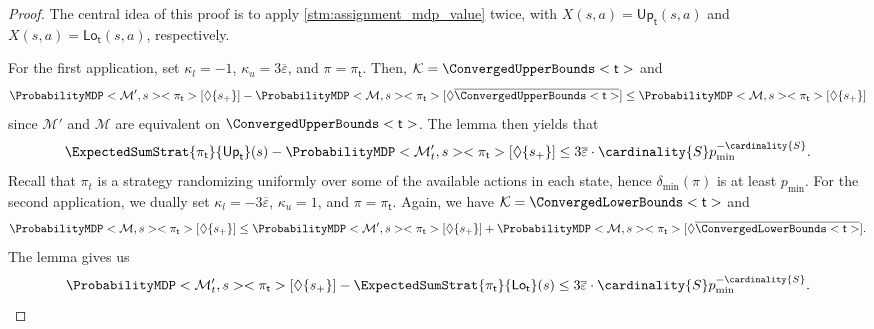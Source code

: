 \documentclass{theoretics}
\newcommand{\MDP}{\mathcal{M}}
\newcommand{\States}{S}
\newcommand{\strategy}{\pi}
\newcommand{\reach}{\Diamond}
\newcommand{\upperbound}{\mathsf{Up}}
\newcommand{\lowerbound}{\mathsf{Lo}}
\newcommand{\targetstate}{s_+}
\newcommand{\updatestep}{{\overline{\varepsilon}}}
\newcommand{\algostep}{\mathsf{t}}
\begin{document}
\begin{proof}
	The central idea of this proof is to apply \cref{stm:assignment_mdp_value} twice, with $X(s, a) = \upperbound_\algostep(s, a)$ and $X(s, a) = \lowerbound_\algostep(s, a)$, respectively.

	For the first application, set $\kappa_l = -1$, $\kappa_u = 3 \updatestep$, and $\strategy = \strategy_\algostep$.
	Then, $\mathcal{K} = \ConvergedUpperBounds<\algostep>$ and
	\begin{equation}
		\ProbabilityMDP<\MDP', s><\strategy_\algostep>[\reach \{\targetstate\}] - \ProbabilityMDP<\MDP, s><\strategy_\algostep>[\reach \overline{\ConvergedUpperBounds<\algostep>}] \leq \ProbabilityMDP<\MDP, s><\strategy_\algostep>[\reach \{\targetstate\}] \label{eq:stm:dql_no_ec:bounds_close:up_probs}
	\end{equation}
	since $\MDP'$ and $\MDP$ are equivalent on $\ConvergedUpperBounds<\algostep>$.
	The lemma then yields that
	\begin{equation}
		\ExpectedSumStrat{\strategy_\algostep}{\upperbound_\algostep}(s) - \ProbabilityMDP<\MDP'_t, s><\strategy_\algostep>[\reach \{\targetstate\}] \leq 3 \updatestep \cdot \cardinality{\States} p_{\min}^{-\cardinality{\States}}. \label{eq:stm:dql_no_ec:bounds_close:up_strat}
	\end{equation}
	Recall that $\strategy_t$ is a strategy randomizing uniformly over some of the available actions in each state, hence $\delta_{\min}(\strategy)$ is at least $p_{\min}$.
	For the second application, we dually set $\kappa_l = - 3 \updatestep$, $\kappa_u = 1$, and $\strategy = \strategy_\algostep$.
	Again, we have $\mathcal{K} = \ConvergedLowerBounds<\algostep>$ and
	\begin{equation}
		\ProbabilityMDP<\MDP, s><\strategy_\algostep>[\reach \{\targetstate\}] \leq \ProbabilityMDP<\MDP', s><\strategy_\algostep>[\reach \{\targetstate\}] + \ProbabilityMDP<\MDP, s><\strategy_\algostep>[\reach \overline{\ConvergedLowerBounds<\algostep>}]. \label{eq:stm:dql_no_ec:bounds_close:low_probs}
	\end{equation}
	The lemma gives us
	\begin{equation}
		\ProbabilityMDP<\MDP'_t, s><\strategy_\algostep>[\reach \{\targetstate\}] - \ExpectedSumStrat{\strategy_\algostep}{\lowerbound_\algostep}(s) \leq 3 \updatestep \cdot \cardinality{\States} p_{\min}^{-\cardinality{\States}}. \label{eq:stm:dql_no_ec:bounds_close:low_strat}
	\end{equation}


\end{proof}
\end{document}
